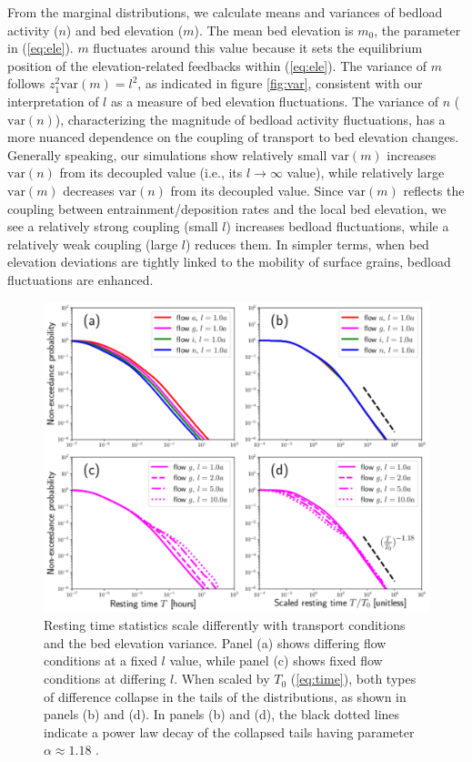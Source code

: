 \documentclass[draft]{agujournal2018}
\begin{document}
From the marginal distributions, we calculate means and variances of bedload activity ($n$) and bed elevation ($m$).
The mean bed elevation is $m_0$, the parameter in (\ref{eq:ele}). $m$ fluctuates around this value because it sets the equilibrium position of the elevation-related feedbacks within (\ref{eq:ele}).
The variance of $m$ follows $z_1^2 \text{var}(m) = l^2$, as indicated in figure \ref{fig:var}, consistent with our interpretation of $l$ as a measure of bed elevation fluctuations.
The variance of $n$ ($\text{var}(n)$), characterizing the magnitude of bedload activity fluctuations, has a more nuanced dependence on the coupling of transport to bed elevation changes.
Generally speaking, our simulations show relatively small $\text{var}(m)$ increases $\text{var}(n)$ from its decoupled value (i.e., its $l\rightarrow \infty$ value), while relatively large $\text{var}(m)$ decreases $\text{var}(n)$ from its decoupled value.
Since $\text{var}(m)$ reflects the coupling between entrainment/deposition rates and the local bed elevation, we see a relatively strong coupling (small $l$) increases bedload fluctuations, while a relatively weak coupling (large $l$) reduces them.
In simpler terms, when bed elevation deviations are tightly linked to the mobility of surface grains, bedload fluctuations are enhanced.
\begin{figure}[t!]
	\includegraphics[width=\linewidth,keepaspectratio]{./figures/montage1.pdf}
	\caption{Resting time statistics scale differently with transport conditions and the bed elevation variance. Panel (a) shows differing flow conditions at a fixed $l$ value, while panel (c) shows fixed flow conditions at differing $l$. When scaled by $T_0$ (\ref{eq:time}), both types of difference collapse in the tails of the distributions, as shown in panels (b) and (d). In panels (b) and (d), the black dotted lines indicate a power law decay of the collapsed tails having parameter $\alpha\approx1.18$ .}
	\label{fig:cdfs}
\end{figure}
\end{document}

